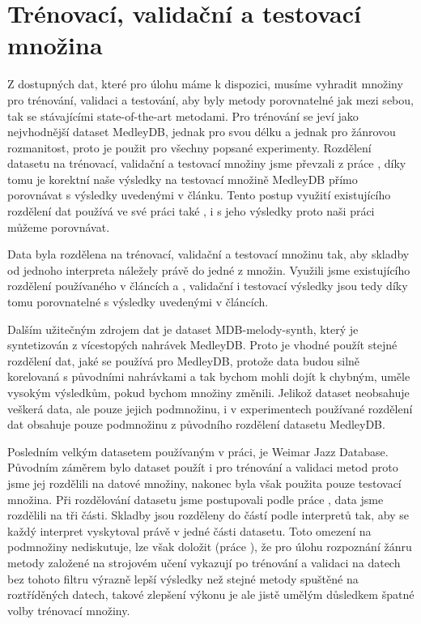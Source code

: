 \section{Trénovací, validační a testovací množina}

Z dostupných dat, které pro úlohu máme k dispozici, musíme vyhradit množiny pro trénování, validaci a testování, aby byly metody porovnatelné jak mezi sebou, tak se stávajícími state-of-the-art metodami. Pro trénování se jeví jako nejvhodnější dataset MedleyDB, jednak pro svou délku a jednak pro žánrovou rozmanitost, proto je použit pro všechny popsané experimenty. Rozdělení datasetu na trénovací, validační a testovací množiny jsme převzali z práce \cite{Bittner2017}, díky tomu je korektní naše výsledky na testovací množině MedleyDB přímo porovnávat s výsledky uvedenými v článku. Tento postup využití existujícího rozdělení dat používá ve své práci také \cite{DBasaranSEssid2018}, i s jeho výsledky proto naši práci můžeme porovnávat.

Data byla rozdělena na trénovací, validační a testovací množinu tak, aby skladby od jednoho interpreta náležely právě do jedné z množin. Využili jsme existujícího rozdělení používaného v článcích \cite{Bittner2017} a \cite{DBasaranSEssid2018}, validační i testovací výsledky jsou tedy díky tomu porovnatelné s výsledky uvedenými v článcích.


Dalším užitečným zdrojem dat je dataset MDB-melody-synth, který je syntetizován z vícestopých nahrávek MedleyDB. Proto je vhodné použít stejné rozdělení dat, jaké se používá pro MedleyDB, protože data budou silně korelovaná s původními nahrávkami a tak bychom mohli dojít k chybným, uměle vysokým výsledkům, pokud bychom množiny změnili. Jelikož dataset neobsahuje veškerá data, ale pouze jejich podmnožinu, i v experimentech používané rozdělení dat obsahuje pouze podmnožinu z původního rozdělení datasetu MedleyDB. 

Posledním velkým datasetem používaným v práci, je Weimar Jazz Database. Původním záměrem bylo dataset použít i pro trénování a validaci metod proto jsme jej rozdělili na datové množiny, nakonec byla však použita pouze testovací množina. Při rozdělování datasetu jsme postupovali podle práce \cite{Bittner2017}, data jsme rozdělili na tři části. Skladby jsou rozděleny do částí podle interpretů tak, aby se každý interpret vyskytoval právě v jedné části datasetu. Toto omezení na podmnožiny \cite{Bittner2017} nediskutuje, lze však doložit (práce \cite{Sturm2013}), že pro úlohu rozpoznání žánru metody založené na strojovém učení vykazují po trénování a validaci na datech bez tohoto filtru výrazně lepší výsledky než stejné metody spuštěné na roztříděných datech, takové zlepšení výkonu je ale jistě umělým důsledkem špatné volby trénovací množiny. 

